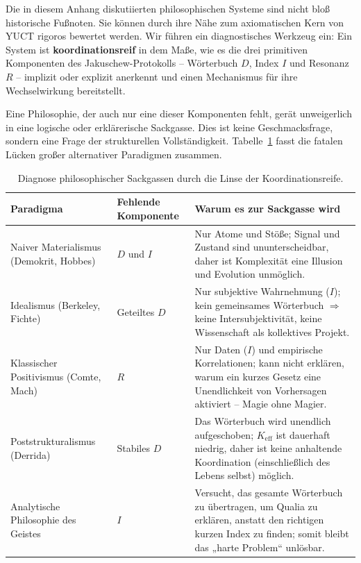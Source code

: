 \documentclass[12pt,a4paper]{article}
\newcommand{\Keff}{K_{\mathrm{eff}}}
\begin{document}
	Die in diesem Anhang diskutiierten philosophischen Systeme sind nicht bloß historische Fußnoten. Sie können durch ihre Nähe zum axiomatischen Kern von YUCT rigoros bewertet werden. Wir führen ein diagnostisches Werkzeug ein: Ein System ist \textbf{koordinationsreif} in dem Maße, wie es die drei primitiven Komponenten des Jakuschew-Protokolls – Wörterbuch \(D\), Index \(I\) und Resonanz \(R\) – implizit oder explizit anerkennt und einen Mechanismus für ihre Wechselwirkung bereitstellt.
	
	Eine Philosophie, der auch nur eine dieser Komponenten fehlt, gerät unweigerlich in eine logische oder erklärerische Sackgasse. Dies ist keine Geschmacksfrage, sondern eine Frage der strukturellen Vollständigkeit. Tabelle~\ref{tab:dead-ends} fasst die fatalen Lücken großer alternativer Paradigmen zusammen.
	
	\begin{table}[htbp]
		\centering
		\caption{Diagnose philosophischer Sackgassen durch die Linse der Koordinationsreife.}
		\label{tab:dead-ends}
		\small
		\begin{tabular}{p{3cm} p{5.5cm} p{5.5cm}}
			\toprule
			\textbf{Paradigma} & \textbf{Fehlende Komponente} & \textbf{Warum es zur Sackgasse wird} \\
			\midrule
			Naiver Materialismus (Demokrit, Hobbes) & \(D\) und \(I\) & Nur Atome und Stöße; Signal und Zustand sind ununterscheidbar, daher ist Komplexität eine Illusion und Evolution unmöglich. \\
			Idealismus (Berkeley, Fichte) & Geteiltes \(D\) & Nur subjektive Wahrnehmung (\(I\)); kein gemeinsames Wörterbuch \(\Rightarrow\) keine Intersubjektivität, keine Wissenschaft als kollektives Projekt. \\
			Klassischer Positivismus (Comte, Mach) & \(R\) & Nur Daten (\(I\)) und empirische Korrelationen; kann nicht erklären, warum ein kurzes Gesetz eine Unendlichkeit von Vorhersagen aktiviert – Magie ohne Magier. \\
			Poststrukturalismus (Derrida) & Stabiles \(D\) & Das Wörterbuch wird unendlich aufgeschoben; \(\Keff\) ist dauerhaft niedrig, daher ist keine anhaltende Koordination (einschließlich des Lebens selbst) möglich. \\
			Analytische Philosophie des Geistes & \(I\) & Versucht, das gesamte Wörterbuch zu übertragen, um Qualia zu erklären, anstatt den richtigen kurzen Index zu finden; somit bleibt das „harte Problem“ unlösbar. \\
			\bottomrule
		\end{tabular}
	\end{table}
	
\end{document}

